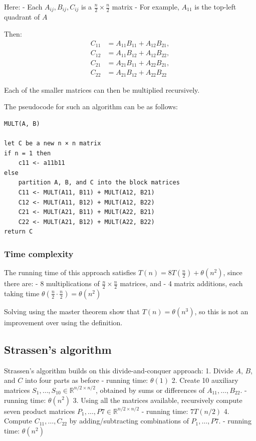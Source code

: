 \documentclass[11pt]{article}
\begin{document}
Here: - Each \(A_{ij}, B_{ij}, C_{ij}\) is a
\(\frac{n}{2} \times \frac{n}{2}\) matrix - For example, \(A_{11}\) is
the top-left quadrant of \(A\)

Then: \[
\begin{aligned}
C_{11} &= A_{11}B_{11} + A_{12}B_{21}, \\
C_{12} &= A_{11}B_{12} + A_{12}B_{22}, \\
C_{21} &= A_{21}B_{11} + A_{22}B_{21}, \\
C_{22} &= A_{21}B_{12} + A_{22}B_{22}
\end{aligned}
\]

Each of the smaller matrices can then be multiplied recursively.

The pseudocode for such an algorithm can be as follows:

\begin{verbatim}
MULT(A, B)

let C be a new n × n matrix
if n = 1 then
    c11 <- a11b11
else
    partition A, B, and C into the block matrices
    C11 <- MULT(A11, B11) + MULT(A12, B21)
    C12 <- MULT(A11, B12) + MULT(A12, B22)
    C21 <- MULT(A21, B11) + MULT(A22, B21)
    C22 <- MULT(A21, B12) + MULT(A22, B22)
return C
\end{verbatim}

    \subsubsection{Time complexity}\label{time-complexity}

The running time of this approach satisfies
\(T(n) = 8T(\frac{n}{2}) + \theta(n^2)\), since there are: - 8
multiplications of \(\frac{n}{2} \times \frac{n}{2}\) matrices, and - 4
matrix additions, each taking time
\(\theta(\frac{n}{2} \cdot \frac{n}{2}) = \theta(n^2)\)

Solving using the master theorem show that \(T(n) = \theta(n^3)\), so
this is not an improvement over using the definition.

    \subsection{Strassen's algorithm}\label{strassens-algorithm}

Strassen's algorithm builds on this divide-and-conquer approach: 1.
Divide \(A\), \(B\), and \(C\) into four parts as before - running time:
\(\theta(1)\) 2. Create 10 auxiliary matrices
\(S_1, \ldots , S_{10} \in \mathbb{R}^{n/2 \times n/2}\), obtained by
sums or differences of \(A_{11}, \ldots , B_{22}\). - running time:
\(\theta(n^2)\) 3. Using all the matrices available, recursively compute
seven product matrices
\(P_1, \ldots , P7 \in \mathbb{R}^{n/2 \times n/2}\) - running time:
\(7T(n/2)\) 4. Compute \(C_{11}, \ldots , C_{22}\) by adding/subtracting
combinations of \(P_1, \ldots , P7\). - running time: \(\theta(n^2)\)
\end{document}
